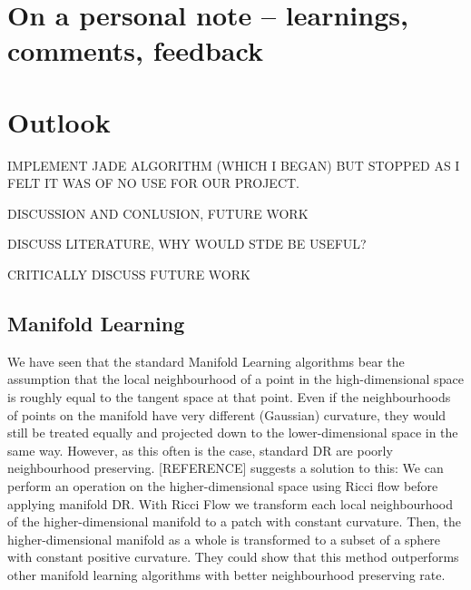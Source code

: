 \documentclass[journal, a4paper]{IEEEtran}
\begin{document}
\section{On a personal note -- learnings, comments, feedback } %


\section{Outlook}

IMPLEMENT JADE ALGORITHM (WHICH I BEGAN) BUT STOPPED AS I FELT IT WAS OF NO USE FOR OUR PROJECT. 

DISCUSSION AND CONLUSION, FUTURE WORK

DISCUSS LITERATURE, WHY WOULD STDE BE USEFUL?

CRITICALLY DISCUSS FUTURE WORK


\subsection{Manifold Learning}

We have seen that the standard Manifold Learning algorithms bear the assumption that the local neighbourhood of a point in the high-dimensional space is roughly equal to the tangent space at that point. Even if the neighbourhoods of points on the manifold have very different (Gaussian) curvature, they would still be treated equally and projected down to the lower-dimensional space in the same way. However, as this often is the case, standard DR are poorly neighbourhood preserving. [REFERENCE] suggests a solution to this: We can perform an operation on the higher-dimensional space using Ricci flow before applying manifold DR. With Ricci Flow we transform each local neighbourhood of the higher-dimensional manifold to a patch with constant curvature. Then, the higher-dimensional manifold as a whole is transformed to a subset of a sphere with constant positive curvature. They could show that this method outperforms other manifold learning algorithms with better neighbourhood preserving rate.
\end{document}
